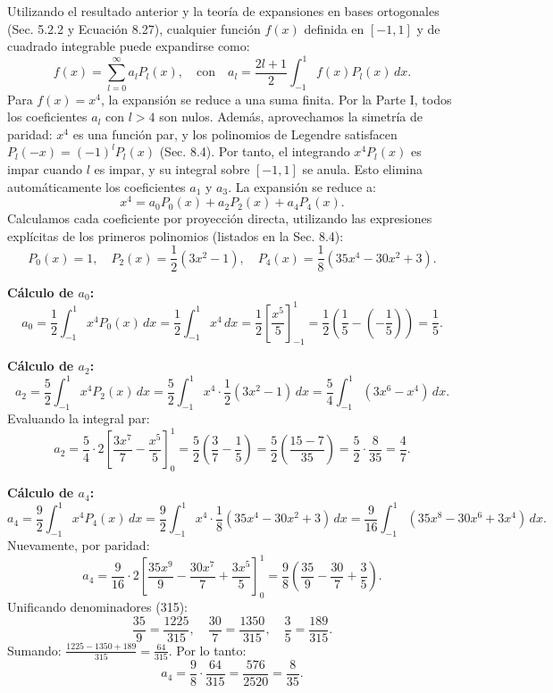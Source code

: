 \documentclass[a4paper]{article}
\begin{document}
Utilizando el resultado anterior y la teoría de expansiones en bases ortogonales (Sec. 5.2.2 y Ecuación 8.27), cualquier función $f(x)$ definida en $[-1, 1]$ y de cuadrado integrable puede expandirse como:
$$
f(x) = \sum_{l=0}^{\infty} a_l P_l(x), \quad \text{con} \quad a_l = \frac{2l+1}{2} \int_{-1}^{1} f(x) P_l(x) \, dx.
$$
Para $f(x) = x^4$, la expansión se reduce a una suma finita. Por la Parte I, todos los coeficientes $a_l$ con $l > 4$ son nulos. Además, aprovechamos la simetría de paridad: $x^4$ es una función par, y los polinomios de Legendre satisfacen $P_l(-x) = (-1)^l P_l(x)$ (Sec. 8.4). Por tanto, el integrando $x^4 P_l(x)$ es impar cuando $l$ es impar, y su integral sobre $[-1, 1]$ se anula. Esto elimina automáticamente los coeficientes $a_1$ y $a_3$. La expansión se reduce a:
$$
x^4 = a_0 P_0(x) + a_2 P_2(x) + a_4 P_4(x).
$$
Calculamos cada coeficiente por proyección directa, utilizando las expresiones explícitas de los primeros polinomios (listados en la Sec. 8.4):
$$
P_0(x) = 1, \quad P_2(x) = \frac{1}{2}(3x^2 - 1), \quad P_4(x) = \frac{1}{8}(35x^4 - 30x^2 + 3).
$$

\noindent\textbf{Cálculo de $a_0$:}
$$
a_0 = \frac{1}{2} \int_{-1}^{1} x^4 P_0(x) \, dx = \frac{1}{2} \int_{-1}^{1} x^4 \, dx = \frac{1}{2} \left[ \frac{x^5}{5} \right]_{-1}^{1} = \frac{1}{2} \left( \frac{1}{5} - \left(-\frac{1}{5}\right) \right) = \frac{1}{5}.
$$

\noindent\textbf{Cálculo de $a_2$:}
$$
a_2 = \frac{5}{2} \int_{-1}^{1} x^4 P_2(x) \, dx = \frac{5}{2} \int_{-1}^{1} x^4 \cdot \frac{1}{2}(3x^2 - 1) \, dx = \frac{5}{4} \int_{-1}^{1} (3x^6 - x^4) \, dx.
$$
Evaluando la integral par:
$$
a_2 = \frac{5}{4} \cdot 2 \left[ \frac{3x^7}{7} - \frac{x^5}{5} \right]_{0}^{1} = \frac{5}{2} \left( \frac{3}{7} - \frac{1}{5} \right) = \frac{5}{2} \left( \frac{15 - 7}{35} \right) = \frac{5}{2} \cdot \frac{8}{35} = \frac{4}{7}.
$$

\noindent\textbf{Cálculo de $a_4$:}
$$
a_4 = \frac{9}{2} \int_{-1}^{1} x^4 P_4(x) \, dx = \frac{9}{2} \int_{-1}^{1} x^4 \cdot \frac{1}{8}(35x^4 - 30x^2 + 3) \, dx = \frac{9}{16} \int_{-1}^{1} (35x^8 - 30x^6 + 3x^4) \, dx.
$$
Nuevamente, por paridad:
$$
a_4 = \frac{9}{16} \cdot 2 \left[ \frac{35x^9}{9} - \frac{30x^7}{7} + \frac{3x^5}{5} \right]_{0}^{1} = \frac{9}{8} \left( \frac{35}{9} - \frac{30}{7} + \frac{3}{5} \right).
$$
Unificando denominadores (315):
$$
\frac{35}{9} = \frac{1225}{315}, \quad \frac{30}{7} = \frac{1350}{315}, \quad \frac{3}{5} = \frac{189}{315}.
$$
Sumando: $\frac{1225 - 1350 + 189}{315} = \frac{64}{315}$. Por lo tanto:
$$
a_4 = \frac{9}{8} \cdot \frac{64}{315} = \frac{576}{2520} = \frac{8}{35}.
$$
\end{document}

